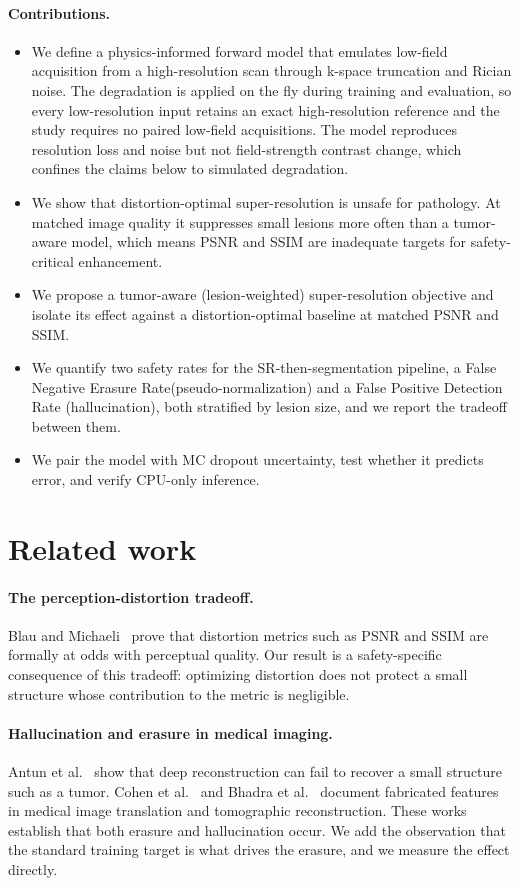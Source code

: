 \documentclass[11pt,a4paper]{article}
\newcommand{\FNER}{False Negative Erasure Rate\xspace}
\newcommand{\SR}{super-resolution\xspace}
\begin{document}
\paragraph{Contributions.}
\begin{itemize}
  \item We define a physics-informed forward model that emulates low-field acquisition from a high-resolution scan through k-space truncation and Rician noise. The degradation is applied on the fly during training and evaluation, so every low-resolution input retains an exact high-resolution reference and the study requires no paired low-field acquisitions. The model reproduces resolution loss and noise but not field-strength contrast change, which confines the claims below to simulated degradation.
  \item We show that distortion-optimal \SR is unsafe for pathology. At matched image quality it suppresses small lesions more often than a tumor-aware model, which means PSNR and SSIM are inadequate targets for safety-critical enhancement.
  \item We propose a tumor-aware (lesion-weighted) \SR objective and isolate its effect against a distortion-optimal baseline at matched PSNR and SSIM.
  \item We quantify two safety rates for the SR-then-segmentation pipeline, a \FNER (pseudo-normalization) and a False Positive Detection Rate (hallucination), both stratified by lesion size, and we report the tradeoff between them.
  \item We pair the model with MC dropout uncertainty, test whether it predicts error, and verify CPU-only inference.
\end{itemize}

\section{Related work}

\paragraph{The perception-distortion tradeoff.}
Blau and Michaeli~\cite{blau2018} prove that distortion metrics such as PSNR and SSIM are formally at odds with perceptual quality. Our result is a safety-specific consequence of this tradeoff: optimizing distortion does not protect a small structure whose contribution to the metric is negligible.

\paragraph{Hallucination and erasure in medical imaging.}
Antun et al.~\cite{antun2020} show that deep reconstruction can fail to recover a small structure such as a tumor. Cohen et al.~\cite{cohen2018} and Bhadra et al.~\cite{bhadra2021} document fabricated features in medical image translation and tomographic reconstruction. These works establish that both erasure and hallucination occur. We add the observation that the standard training target is what drives the erasure, and we measure the effect directly.
\end{document}
